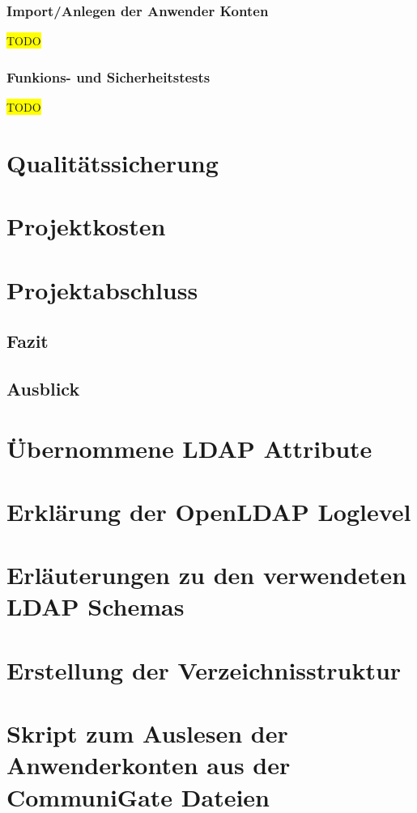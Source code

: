 \documentclass[11pt,a4paper,titlepage=firstiscover]{scrartcl} %
\newcommand{\hilight}[1]{\colorbox{yellow}{#1}} %
\begin{document}
\subsubsection{Import/Anlegen der Anwender Konten}
\hilight{TODO}
\subsubsection{Funkions- und Sicherheitstests}
\hilight{TODO}


\newpage
\section{Qualitätssicherung}
\section{Projektkosten}
\section{Projektabschluss}
\subsection{Fazit}
\subsection{Ausblick}

\appendix
{} %
\newpage
\section{Übernommene LDAP Attribute} \label{sec:LDAP-Attribute}
\newpage
\section{Erklärung der OpenLDAP Loglevel} \label{sec:LDAP-Loglevel}
\newpage
\section{Erläuterungen zu den verwendeten LDAP Schemas}\label{sec:LDAP-Schema}
\newpage
\section{Erstellung der Verzeichnisstruktur}\label{sec:Erstelle-DB}
\newpage
\section{Skript zum Auslesen der Anwenderkonten aus der CommuniGate Dateien}\label{sec:SkriptA}
\newpage
\end{document}
